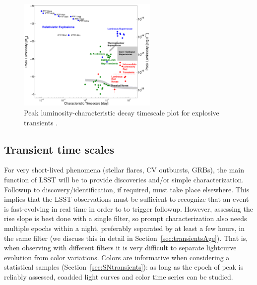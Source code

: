 \begin{figure}[hbt]
\centerline{
\includegraphics[width=0.6\textwidth]{figs/transients/taumv_2014.pdf}
}
\caption{
Peak luminosity-characteristic decay timescale plot for explosive
transients \citep[adapted from][]{2011PhDT........35K}.
}
\label{fig:transient_phase_space}
\end{figure}





%




\subsection{Transient time scales}

For very short-lived phenomena (stellar flares, CV outbursts, GRBs),
the main function of LSST will be to provide discoveries and/or simple
characterization.  Followup to discovery/identification, if required,
must take place elsewhere. This implies that the LSST observations
must be sufficient to recognize that an event is fast-evolving in real
time in order to to trigger followup. However, assessing the rise
slope is best done with a single filter, so prompt characterization
also needs multiple epochs within a night, preferably separated by at
least a few hours, in the same filter (we discuss this in detail in
Section~\ref{sec:transientsAge}). That is, when observing with different
filters it is very difficult to separate lightcurve evolution from
color variations. Colors are informative when considering a statistical
samples (Section~\ref{sec:SNtransients}): as long as the epoch of peak is
reliably assessed, coadded light curves and color time series can be studied.

